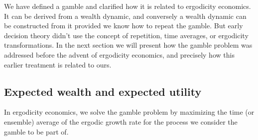 
We have defined a gamble and clarified how it is related to ergodicity economics. 
It can be derived from a wealth dynamic, 
and conversely a wealth dynamic can be constructed from it provided we know 
how to repeat the gamble. But early decision theory didn't use the concept of 
repetition, time averages, or ergodicity transformations. In the next section we will 
present how the gamble problem was addressed before the advent of ergodicity 
economics, and precisely how this earlier treatment is related to ours.

\subsection{Expected wealth and expected utility}

In ergodicity economics, we solve the gamble problem by maximizing the time (or ensemble) average
of the ergodic growth rate for the process we consider the gamble to be part of. 

